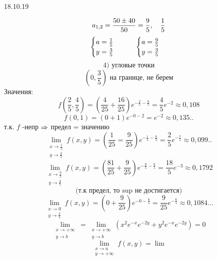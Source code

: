 \documentclass[matan.tex]{subfiles}
\begin{document}
\begin{lect}{18.10.19}
\begin{Task}[1]
        \[a_{1,2} = \frac{50 \pm 40}{50} = \frac{9}{5}, \quad \frac{1}{5} \]
        \[\begin{cases}
            a = \frac{1}{5}\\
            y = \frac{3}{5}
        \end{cases} \qquad \begin{cases}
            a = \frac{9}{5}\\
            y = \frac{3}{5}
        \end{cases}\]
        \[4) \text{ угловые точки}\]
        \[(0, \frac{3}{5}) \text{ на границе, не берем}\]
        Значения:
        \[f(\frac{2}{5}, \frac{4}{5}) = (\frac{4}{25} + \frac{16}{25})e^{-\frac{2}{5} - 
        \frac{8}{5}} = \frac{4}{5}e^{-2} \approx 0,108\]
        \[f(0, 1) = (0 + 1)e^{-0 -2} = e^{-2} \approx 0,135.. \]
            т.к. $f $ -непр $\Rightarrow $ предел = значению
        \[\lim_{\begin{matrix}
            x \to \frac{1}{5}\\
            y \to \frac{3}{5}
        \end{matrix}} f(x, y) = (\frac{1}{25}
        = \frac{9}{25})e^{-\frac{1}{5} - \frac{6}{5}} =
        \frac{2}{5}e^{-\frac{7}{5}} \approx 0,099.. \]
        \[\lim_{\begin{matrix}
            x \to \frac{9}{5}\\
            y \to \frac{3}{5}
    \end{matrix}} f(x, y) = (\frac{81}{25} + \frac{9}{25})e^{-\frac{9}{5} - \frac{6}{5}} 
    = \frac{18}{5} e^{-3} \approx 0,1792\]
    \[ \text{(т.к предел, то $\sup$ не достигается)}\]
    \[\lim_{\begin{matrix}
        x \to 0\\
        y \to \frac{3}{5}
    \end{matrix}} f(x, y) = (0 + \frac{9}{25})e^{- 0 - \frac{6}{5}} =
    \frac{9}{25}e^{-\frac{6}{5}} \approx 0,1084...   \]
    \[\lim_{\begin{matrix}
        x \to +\infty\\
        y \to b
    \end{matrix}} = \lim_{\begin{matrix}
        x \to +\infty\\
        y \to b
    \end{matrix}} (x^2e^{-x}e^{-2y} + y^2e^{-x} e^{-2y}) = 0 \]
    \[\lim_{\begin{matrix}
        x \to a\\
        y \to +\infty
    \end{matrix}} f(x, y) = \lim_{\begin{matrix}

\end{matrix}}\]
\end{Task}
\end{lect}
\end{document}
